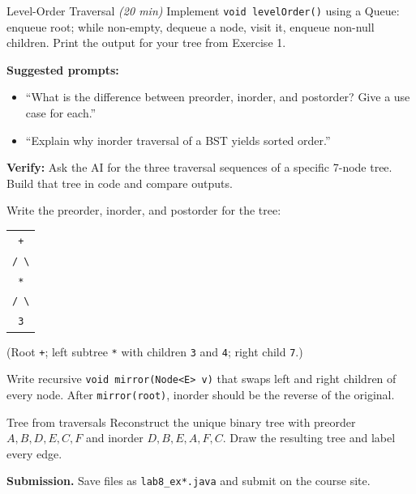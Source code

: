 \documentclass[11pt]{article}
\begin{document}
\begin{labexercise}{Level-Order Traversal \hfill {\small \itshape (20 min)}}
Implement \texttt{void levelOrder()} using a Queue: enqueue root; while non-empty, dequeue a node,
visit it, enqueue non-null children. Print the output for your tree from Exercise 1.
\end{labexercise}

\begin{aicollab}
\textbf{Suggested prompts:}
\begin{itemize}[leftmargin=*,nosep]
  \item ``What is the difference between preorder, inorder, and postorder? Give a use case for each.''
  \item ``Explain why inorder traversal of a BST yields sorted order.''
\end{itemize}
\medskip\textbf{Verify:} Ask the AI for the three traversal sequences of a specific 7-node tree.
Build that tree in code and compare outputs.
\end{aicollab}

\takehomebanner

\begin{trace}
Write the preorder, inorder, and postorder for the tree:
\begin{center}
\begin{tabular}{c}
\texttt{+} \\ \texttt{/ \textbackslash} \\ \texttt{*\quad 7} \\ \texttt{/ \textbackslash} \\ \texttt{3\quad 4}
\end{tabular}
\end{center}
(Root \texttt{+}; left subtree \texttt{*} with children \texttt{3} and \texttt{4}; right child \texttt{7}.)
\end{trace}

\begin{writecode}
Write recursive \texttt{void mirror(Node<E> v)} that swaps left and right children of every node.
After \texttt{mirror(root)}, inorder should be the reverse of the original.
\end{writecode}

\begin{drawex}{Tree from traversals}
Reconstruct the unique binary tree with preorder $A, B, D, E, C, F$ and inorder $D, B, E, A, F, C$.
Draw the resulting tree and label every edge.
\end{drawex}

\vspace{4pt}
\noindent\textbf{Submission.} Save files as \texttt{lab8\_ex*.java} and submit on the course site.
\end{document}
